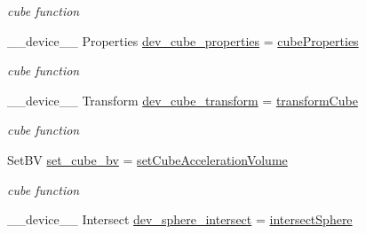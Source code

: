 \begin{DoxyCompactItemize}
\begin{DoxyCompactList}\small\item\em cube function \end{DoxyCompactList}\item 
\+\_\+\+\_\+device\+\_\+\+\_\+ Properties \hyperlink{group__device__pointers_ga2d4562e3ca58496f57bb1d3cff526d25}{dev\+\_\+cube\+\_\+properties} = \hyperlink{group__intersection__test__prperties_ga33e6e14712999e0675085b5479201656}{cube\+Properties}\hypertarget{group__device__pointers_ga2d4562e3ca58496f57bb1d3cff526d25}{}\label{group__device__pointers_ga2d4562e3ca58496f57bb1d3cff526d25}

\begin{DoxyCompactList}\small\item\em cube function \end{DoxyCompactList}\item 
\+\_\+\+\_\+device\+\_\+\+\_\+ Transform \hyperlink{group__device__pointers_gab1b1881cdcd02a40f59daec059586d68}{dev\+\_\+cube\+\_\+transform} = \hyperlink{group__intersection__test__prperties_ga00e56ff810e7ba397e903acf50626b55}{transform\+Cube}\hypertarget{group__device__pointers_gab1b1881cdcd02a40f59daec059586d68}{}\label{group__device__pointers_gab1b1881cdcd02a40f59daec059586d68}

\begin{DoxyCompactList}\small\item\em cube function \end{DoxyCompactList}\item 
Set\+BV \hyperlink{group__device__pointers_gaec206099dfbd80a9d2e14d71b1fe150f}{set\+\_\+cube\+\_\+bv} = \hyperlink{group__intersection__test__prperties_gabfac85fdf9d0cceb70aefa4c2ed71ad2}{set\+Cube\+Acceleration\+Volume}\hypertarget{group__device__pointers_gaec206099dfbd80a9d2e14d71b1fe150f}{}\label{group__device__pointers_gaec206099dfbd80a9d2e14d71b1fe150f}

\begin{DoxyCompactList}\small\item\em cube function \end{DoxyCompactList}\item 
\+\_\+\+\_\+device\+\_\+\+\_\+ Intersect \hyperlink{group__device__pointers_ga8f39c98f1f65e4214ac0e5daa8806611}{dev\+\_\+sphere\+\_\+intersect} = \hyperlink{group__intersection__test__prperties_ga8c05ac13c3cdd49f7e4fa3948cfa4699}{intersect\+Sphere}\hypertarget{group__device__pointers_ga8f39c98f1f65e4214ac0e5daa8806611}{}\label{group__device__pointers_ga8f39c98f1f65e4214ac0e5daa8806611}


\end{DoxyCompactItemize}

